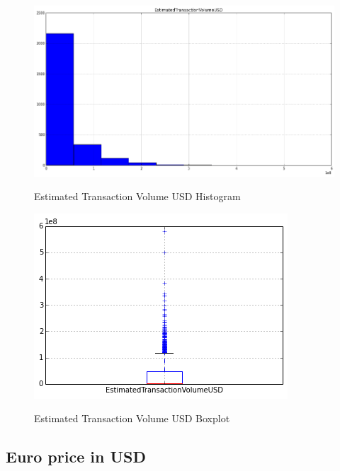 \begin{figure}[bth]
  \myfloatalign
  {\includegraphics[width=1\linewidth]
    {gfx/estimated-transaction-volume-usd-histogram}}
  \caption{Estimated Transaction Volume USD Histogram}
  \label{fig:estimated-transaction-volume-usd-histogram}
\end{figure}

\begin{figure}[bth]
  \myfloatalign
  {\includegraphics[width=1\linewidth]
    {gfx/estimated-transaction-volume-usd-boxplot}}
  \caption{Estimated Transaction Volume USD Boxplot}
  \label{fig:estimated-transaction-volume-usd-boxplot}
\end{figure}

\clearpage


\subsection{Euro price in USD}
\label{sec:euro-price-in-usd}

